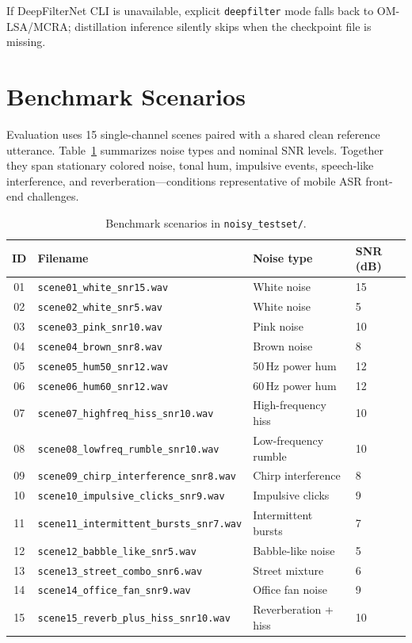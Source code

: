 If DeepFilterNet CLI is unavailable, explicit \texttt{deepfilter} mode falls back to OM-LSA/MCRA; distillation inference silently skips when the checkpoint file is missing.

\section{Benchmark Scenarios}
\label{sec:benchmark}

Evaluation uses 15 single-channel scenes paired with a shared clean reference utterance. Table~\ref{tab:benchmark_scenes} summarizes noise types and nominal SNR levels. Together they span stationary colored noise, tonal hum, impulsive events, speech-like interference, and reverberation---conditions representative of mobile ASR front-end challenges.

\begin{table}[H]
  \centering
  \caption{Benchmark scenarios in \texttt{noisy\_testset/}.}
  \label{tab:benchmark_scenes}
  \small
  \begin{tabular}{clll}
    \toprule
    \textbf{ID} & \textbf{Filename} & \textbf{Noise type} & \textbf{SNR (dB)} \\
    \midrule
    01 & \texttt{scene01\_white\_snr15.wav}              & White noise        & 15 \\
    02 & \texttt{scene02\_white\_snr5.wav}               & White noise        & 5  \\
    03 & \texttt{scene03\_pink\_snr10.wav}               & Pink noise         & 10 \\
    04 & \texttt{scene04\_brown\_snr8.wav}               & Brown noise        & 8  \\
    05 & \texttt{scene05\_hum50\_snr12.wav}              & 50\,Hz power hum   & 12 \\
    06 & \texttt{scene06\_hum60\_snr12.wav}              & 60\,Hz power hum   & 12 \\
    07 & \texttt{scene07\_highfreq\_hiss\_snr10.wav}     & High-frequency hiss& 10 \\
    08 & \texttt{scene08\_lowfreq\_rumble\_snr10.wav}     & Low-frequency rumble& 10 \\
    09 & \texttt{scene09\_chirp\_interference\_snr8.wav} & Chirp interference & 8  \\
    10 & \texttt{scene10\_impulsive\_clicks\_snr9.wav}   & Impulsive clicks   & 9  \\
    11 & \texttt{scene11\_intermittent\_bursts\_snr7.wav}& Intermittent bursts& 7  \\
    12 & \texttt{scene12\_babble\_like\_snr5.wav}        & Babble-like noise  & 5  \\
    13 & \texttt{scene13\_street\_combo\_snr6.wav}       & Street mixture     & 6  \\
    14 & \texttt{scene14\_office\_fan\_snr9.wav}          & Office fan noise   & 9  \\
    15 & \texttt{scene15\_reverb\_plus\_hiss\_snr10.wav} & Reverberation + hiss& 10 \\
    \bottomrule
  \end{tabular}
\end{table}

